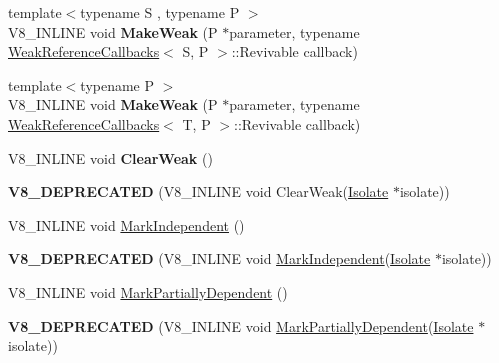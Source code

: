 \begin{DoxyCompactItemize}
\item 
\hypertarget{classv8_1_1_persistent_a1158600c97e5afaf1c2d28970abf915a}{}{\footnotesize template$<$typename S , typename P $>$ }\\V8\+\_\+\+I\+N\+L\+I\+N\+E void {\bfseries Make\+Weak} (P $\ast$parameter, typename \hyperlink{classv8_1_1_weak_reference_callbacks}{Weak\+Reference\+Callbacks}$<$ S, P $>$\+::Revivable callback)\label{classv8_1_1_persistent_a1158600c97e5afaf1c2d28970abf915a}

\item 
\hypertarget{classv8_1_1_persistent_a9c97061d4473a232e65b5415e864e516}{}{\footnotesize template$<$typename P $>$ }\\V8\+\_\+\+I\+N\+L\+I\+N\+E void {\bfseries Make\+Weak} (P $\ast$parameter, typename \hyperlink{classv8_1_1_weak_reference_callbacks}{Weak\+Reference\+Callbacks}$<$ T, P $>$\+::Revivable callback)\label{classv8_1_1_persistent_a9c97061d4473a232e65b5415e864e516}

\item 
\hypertarget{classv8_1_1_persistent_af1a1228291c5272f224b41080b5a2e45}{}V8\+\_\+\+I\+N\+L\+I\+N\+E void {\bfseries Clear\+Weak} ()\label{classv8_1_1_persistent_af1a1228291c5272f224b41080b5a2e45}

\item 
\hypertarget{classv8_1_1_persistent_aebc96cc416c6ef8840a12a5ed3bcb309}{}{\bfseries V8\+\_\+\+D\+E\+P\+R\+E\+C\+A\+T\+E\+D} (V8\+\_\+\+I\+N\+L\+I\+N\+E void Clear\+Weak(\hyperlink{classv8_1_1_isolate}{Isolate} $\ast$isolate))\label{classv8_1_1_persistent_aebc96cc416c6ef8840a12a5ed3bcb309}

\item 
V8\+\_\+\+I\+N\+L\+I\+N\+E void \hyperlink{classv8_1_1_persistent_ad2d7495af17c3ae917f1fbb8c36c9f86}{Mark\+Independent} ()
\item 
\hypertarget{classv8_1_1_persistent_a322c200dbee854fe118b164567f038d9}{}{\bfseries V8\+\_\+\+D\+E\+P\+R\+E\+C\+A\+T\+E\+D} (V8\+\_\+\+I\+N\+L\+I\+N\+E void \hyperlink{classv8_1_1_persistent_ad2d7495af17c3ae917f1fbb8c36c9f86}{Mark\+Independent}(\hyperlink{classv8_1_1_isolate}{Isolate} $\ast$isolate))\label{classv8_1_1_persistent_a322c200dbee854fe118b164567f038d9}

\item 
V8\+\_\+\+I\+N\+L\+I\+N\+E void \hyperlink{classv8_1_1_persistent_a94fd3d423f3e437e9d880e6f7271f7f1}{Mark\+Partially\+Dependent} ()
\item 
\hypertarget{classv8_1_1_persistent_a474f920899f2de6e88b19196a34e97aa}{}{\bfseries V8\+\_\+\+D\+E\+P\+R\+E\+C\+A\+T\+E\+D} (V8\+\_\+\+I\+N\+L\+I\+N\+E void \hyperlink{classv8_1_1_persistent_a94fd3d423f3e437e9d880e6f7271f7f1}{Mark\+Partially\+Dependent}(\hyperlink{classv8_1_1_isolate}{Isolate} $\ast$isolate))\label{classv8_1_1_persistent_a474f920899f2de6e88b19196a34e97aa}


\end{DoxyCompactItemize}
